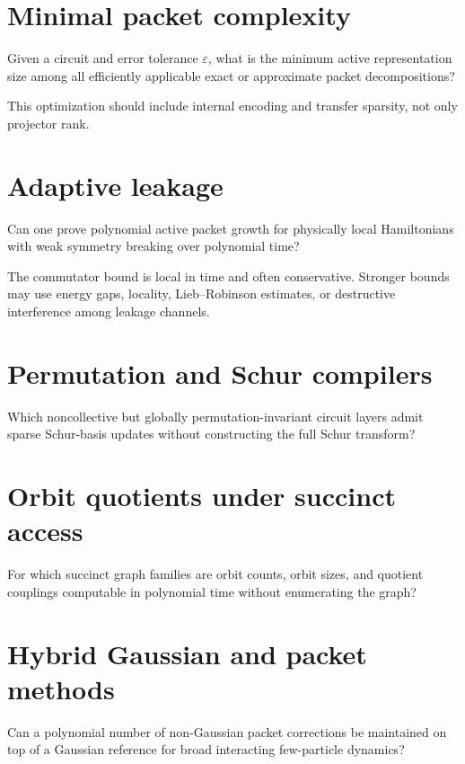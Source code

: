 \section{Minimal packet complexity}
\begin{question}
Given a circuit and error tolerance $\varepsilon$, what is the minimum active representation size among all efficiently applicable exact or approximate packet decompositions?
\end{question}
This optimization should include internal encoding and transfer sparsity, not only projector rank.

\section{Adaptive leakage}
\begin{question}
Can one prove polynomial active packet growth for physically local Hamiltonians with weak symmetry breaking over polynomial time?
\end{question}
The commutator bound is local in time and often conservative. Stronger bounds may use energy gaps, locality, Lieb--Robinson estimates, or destructive interference among leakage channels.

\section{Permutation and Schur compilers}
\begin{question}
Which noncollective but globally permutation-invariant circuit layers admit sparse Schur-basis updates without constructing the full Schur transform?
\end{question}

\section{Orbit quotients under succinct access}
\begin{question}
For which succinct graph families are orbit counts, orbit sizes, and quotient couplings computable in polynomial time without enumerating the graph?
\end{question}

\section{Hybrid Gaussian and packet methods}
\begin{question}
Can a polynomial number of non-Gaussian packet corrections be maintained on top of a Gaussian reference for broad interacting few-particle dynamics?
\end{question}

